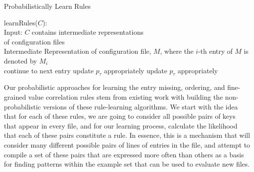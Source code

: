 \begin{algorithm}
\caption{Probabilistically Learn Rules}
  \begin{algorithmic}[1]
    \State learnRules($C$):\\
    Input: $C$ contains intermediate representations\\ 
     \qquad \enspace \enspace of configuration files\\
    Intermediate Representation of configuration file, $M$, where the $i$-th entry of $M$ is denoted by $M_i$\\
                        \State continue to next entry
               \EndIf
                                        \State update $p_{\tau}$ appropriately
                                        \State update $p_{\tau}$ appropriately
                                \EndIf
                        \EndFor
               \EndFor
          \EndFor
      \EndFor
  \end{algorithmic}
\end{algorithm}


Our probabilistic approaches for learning the entry missing, 
ordering, and fine-grained value correlation rules stem 
from existing work with building 
the non-probabilistic versions of these rule-learning algorithms. 
We start with the idea that for each of these rules, 
we are going to consider all possible pairs of keys that appear in every 
file, and for our learning process, calculate the likelihood that each of 
these pairs constitute a rule. 
In essence, this is a mechanism that will consider many different possible 
pairs of lines of entries in the file, 
and attempt to compile a set of these pairs 
that are expressed more often than others as a basis for finding patterns 
within the example set that can be used to evaluate new files.

